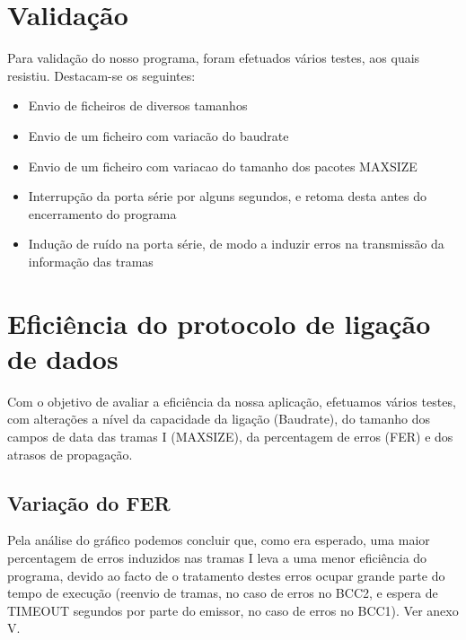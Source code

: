 \documentclass[article, a4paper, 11pt, oneside]{memoir}
\begin{document}
\chapter[Validação][Validação]{Validação} \label{\thechapter}

Para validação do nosso programa, foram efetuados vários testes, aos quais resistiu. Destacam-se os seguintes:

\begin{itemize}
	\item Envio de ficheiros de diversos tamanhos
	\item Envio de um ficheiro com variacão do baudrate
	\item Envio de um ficheiro com variacao do tamanho dos pacotes MAX\textunderscore SIZE
	\item Interrupção da porta série por alguns segundos, e retoma desta antes do encerramento do programa
	\item Indução de ruído na porta série, de modo a induzir erros na transmissão da informação das tramas
\end{itemize}

\chapter[Eficiência do protocolo de ligação de dados][Eficiência do protocolo de ligação de dados]{Eficiência do protocolo de ligação de dados} \label{\thechapter}

Com o objetivo de avaliar a eficiência da nossa aplicação, efetuamos vários testes, com alterações a nível da capacidade
da ligação (Baudrate), do tamanho dos campos de data das tramas I (MAX\textunderscore SIZE), da percentagem de erros (FER) e dos atrasos de propagação.

\section{Variação do FER}

Pela análise do gráfico podemos concluir que, como era esperado, uma maior percentagem de erros
induzidos nas tramas I leva a uma menor eficiência do programa, devido ao facto de o tratamento destes erros ocupar grande parte do tempo de execução
(reenvio de tramas, no caso de erros no BCC2, e espera de TIMEOUT segundos por parte do emissor, no caso de erros no BCC1). Ver anexo V.
\end{document}
